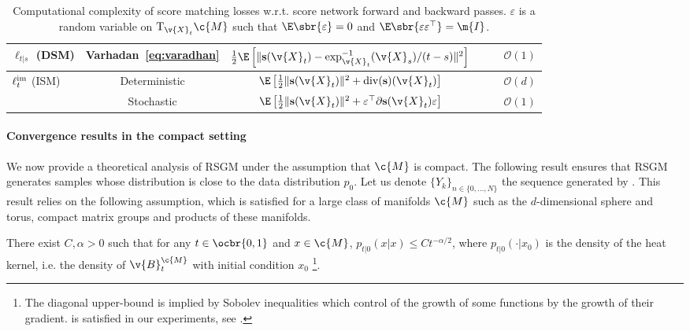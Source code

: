 \begin{table}[t]
\begin{tabular}{lc|c|cc|c}
		$\ell_{t|s}$ (DSM)                                & Varhadan~\eqref{eq:varadhan}            & $\frac{1}{2} \E \left[ \| \mathbf{s}(\v{X}_t) - \exp^{-1}_{\v{X}_t}(\v{X}_s) / (t-s) \|^2 \right]$                      & \xmark                                             & \cmark                        & $\mathcal{O}(1)$ \\ \midrule
		\multirow{2}{4.5em}{$\ell^{\textup{im}}_t$ (ISM)} & Deterministic                           & $\E \left[\frac{1}{2} \| \mathbf{s}(\v{X}_t) \|^2 + \mathrm{div}( \mathbf{s})(\v{X}_t)  \right]$                        & \xmark                                             & \xmark                        & $\mathcal{O}(d)$ \\
		                                                  & Stochastic                              & $\E \left[\frac{1}{2} \| \mathbf{s}(\v{X}_t) \|^2 + \varepsilon^\top \partial \mathbf{s}(\v{X}_t) \varepsilon  \right]$ & \xmark                                             & \xmark                        & $\mathcal{O}(1)$ \\ \bottomrule
	\end{tabular}
	\caption{\small
	Computational complexity of score matching losses w.r.t. score network forward and backward passes. $\varepsilon$ is a random variable on $\mathrm{T}_{\v{X}_t}\c{M}$ such that $\E\sbr{\varepsilon}=0$ and $\E\sbr{\varepsilon\varepsilon^\top}=\m{I}$.}
	\label{tab:sm_losses}
\end{table}

\paragraph{Convergence results in the compact setting}
\label{sec:convergence-results}
We now provide a theoretical analysis of RSGM under the assumption that $\c{M}$ is compact.
The following result ensures that RSGM generates samples whose distribution is close to the data distribution $p_0$.
Let us denote $\{Y_k\}_{n \in \{0, \dots, N\}}$ the sequence generated by .
This result relies on the following assumption, which is satisfied for a large class of manifolds $\c{M}$ such as the $d$-dimensional sphere and torus, compact matrix groups and products of these manifolds.
\begin{assumption}
	\label{assum:manifold}
	There exist $C, \alpha >0$ such that for any $t \in \ocbr{0,1}$ and $x \in \c{M}$, $p_{t|0}(x|x) \leq C t^{-\alpha/2}$, where $p_{t|0}(\cdot|x_0)$ is the density of the heat kernel, i.e. the density of $\v{B}_t^\c{M}$ with initial condition $x_0$ \footnote{The diagonal upper-bound is implied by Sobolev inequalities which control of the growth of some functions by the growth of their gradient.
		 is satisfied in our experiments, see  \textcite{saloff1994precise,gross1992logarithmic}.}.
\end{assumption}

